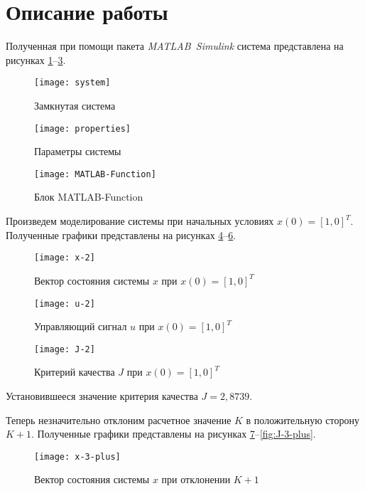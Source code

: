 \documentclass[14pt, a4paper]{extarticle}
\begin{document}
	\newpage
	
	\section*{Описание работы}
	
	Полученная при помощи пакета \textit{MATLAB~Simulink} система представлена на рисунках \ref{fig:system}--\ref{fig:MATLAB-Function}.
	
	\begin{figure}[H]
		\centering
		\texttt{[image: system]}
		\caption{Замкнутая система}
		\label{fig:system}
	\end{figure}

	\begin{figure}[H]
		\centering
		\texttt{[image: properties]}
		\caption{Параметры системы}
		\label{fig:properties}
	\end{figure}

	\begin{figure}[H]
		\centering
		\texttt{[image: MATLAB-Function]}
		\caption{Блок MATLAB-Function}
		\label{fig:MATLAB-Function}
	\end{figure}

	Произведем моделирование системы при начальных условиях $x(0)=[1,0]^T$. Полученные графики представлены на рисунках \ref{fig:x-2}--\ref{fig:J-2}.

	\begin{figure}[H]
		\centering
		\texttt{[image: x-2]}
		\caption{Вектор состояния системы $x$ при $x(0)=[1,0]^T$}
		\label{fig:x-2}
	\end{figure}

	\begin{figure}[H]
		\centering
		\texttt{[image: u-2]}
		\caption{Управляющий сигнал $u$ при $x(0)=[1,0]^T$}
		\label{fig:u-2}
	\end{figure}

	\begin{figure}[H]
		\centering
		\texttt{[image: J-2]}
		\caption{Критерий качества $J$ при $x(0)=[1,0]^T$}
		\label{fig:J-2}
	\end{figure}

	Установившееся значение критерия качества $J=2,8739$.
	
	Теперь незначительно отклоним расчетное значение $K$ в положительную сторону $K+1$. Полученные графики представлены на рисунках \ref{fig:x-3-plus}--\ref{fig:J-3-plus}.
	
	\begin{figure}[H]
		\centering
		\texttt{[image: x-3-plus]}
		\caption{Вектор состояния системы $x$ при отклонении $K+1$}
		\label{fig:x-3-plus}
	\end{figure}
	
\end{document}
